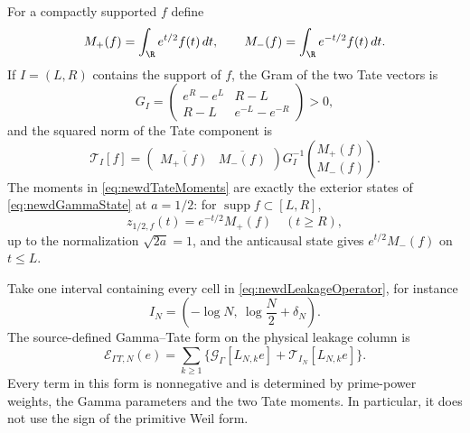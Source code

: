 For a compactly supported $f$ define
\begin{equation}\label{eq:newdTateMoments}
 M_+(f)=\int_\R e^{t/2}f(t)\,dt,
 \qquad
 M_-(f)=\int_\R e^{-t/2}f(t)\,dt.
\end{equation}
If $I=(L,R)$ contains the support of $f$, the Gram of the two Tate vectors is
\begin{equation}\label{eq:newdExteriorTateGram}
 G_I=
 \begin{pmatrix}
 e^R-e^L&R-L\\
 R-L&e^{-L}-e^{-R}
 \end{pmatrix}>0,
\end{equation}
and the squared norm of the Tate component is
\begin{equation}\label{eq:newdTateTerminalForm}
 \mathcal T_I[f]=
 \begin{pmatrix}\overline{M_+(f)}&\overline{M_-(f)}\end{pmatrix}
 G_I^{-1}
 \binom{M_+(f)}{M_-(f)}.
\end{equation}
The moments in \eqref{eq:newdTateMoments} are exactly the exterior states of
\eqref{eq:newdGammaState} at $a=1/2$: for
$\operatorname{supp}f\subset[L,R]$,
\[
 z_{1/2,f}(t)=e^{-t/2}M_+(f)\quad(t\geq R),
\]
up to the normalization $\sqrt{2a}=1$, and the anticausal state gives
$e^{t/2}M_-(f)$ on $t\leq L$.

Take one interval containing every cell in
\eqref{eq:newdLeakageOperator}, for instance
\begin{equation}\label{eq:newdGlobalLeakageInterval}
 I_N=\left(-\log N,\ \log\frac N2+\delta_N\right).
\end{equation}
The source-defined Gamma--Tate form on the physical leakage column is
\begin{equation}\label{eq:newdGammaTateForm}
 \mathcal E_{\Gamma T,N}(e)=
 \sum_{k\geq1}
 \bigl\{\mathcal G_\Gamma[L_{N,k}e]
       +\mathcal T_{I_N}[L_{N,k}e]\bigr\}.
\end{equation}
Every term in this form is nonnegative and is determined by prime-power
weights, the Gamma parameters and the two Tate moments.  In particular, it
does not use the sign of the primitive Weil form.

